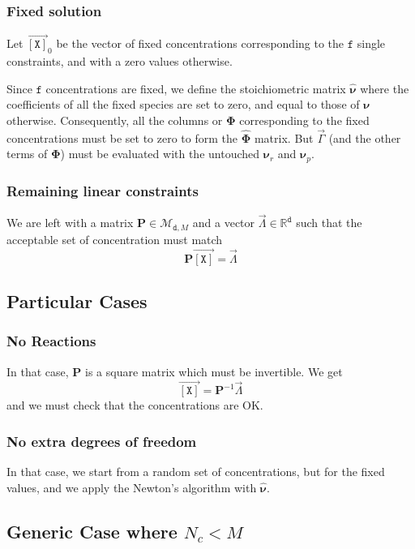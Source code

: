 \documentclass[aps,twocolumn]{revtex4}
\newcommand{\myconc}[1]{\left\lbrack #1 \right\rbrack}
\newcommand{\mychem}[1]{{\mathtt{#1}}}
\newcommand{\mymat}[1]{\boldsymbol{#1}}
\newcommand{\myvec}[1]{\overrightarrow{#1}}
\newcommand{\vecX}{\myvec{\myconc{\mychem{X}}}}
\newcommand{\dof}{\mathtt{d}}
\newcommand{\fixed}{\mathtt{f}}
\begin{document}
\subsubsection{Fixed solution}
Let $\vecX_0$ be the vector of fixed concentrations corresponding to the $\fixed$ single constraints, and with
a zero values otherwise.
	
Since $\fixed$ concentrations are fixed, we define the stoichiometric matrix $\hat{\mymat{\nu}}$
where the coefficients of all the fixed species are set to zero, and equal to those of $\mymat{\nu}$ otherwise.
Consequently, all the columns or $\mymat{\Phi}$ corresponding to the fixed concentrations must 
be set to zero to form the $\hat{\mymat{\Phi}}$ matrix. 
But $\vec{\Gamma}$ (and the other terms of $\mymat{\Phi}$) must be evaluated with
the untouched $\mymat{\nu}_r$ and $\mymat{\nu}_p$.

\subsubsection{Remaining linear constraints}
We are left with a matrix $\mymat{P}\in\mathcal{M}_{\dof,M}$ and a vector $\vec{\Lambda}\in\mathbb{R}^{\dof}$ such
that the acceptable set of concentration must match
\begin{equation}
	\mymat{P}\vecX = \vec{\Lambda}
\end{equation}

\subsection{Particular Cases}
\subsubsection{No Reactions}
In that case, $\mymat{P}$ is a square matrix which must be invertible.
We get
$$
	\vecX = \mymat{P}^{-1}\vec{\Lambda}
$$
and we must check that the concentrations are OK.

\subsubsection{No extra degrees of freedom}
In that case, we start from a random set of concentrations, but for the fixed values, and
we apply the Newton's algorithm with $\hat{\mymat{\nu}}$.

\subsection{Generic Case where $N_c<M$}
\end{document}

